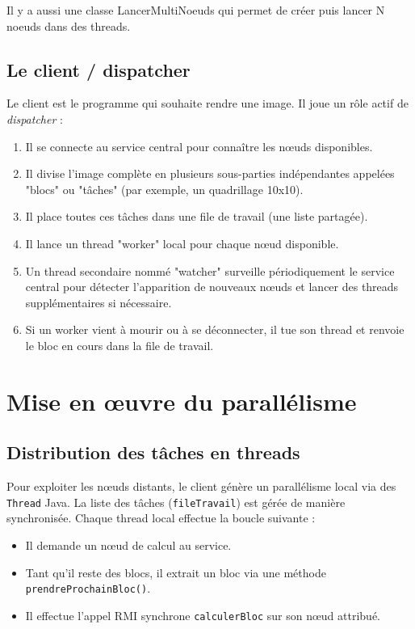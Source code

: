 \documentclass[a4paper,11pt]{article}
\begin{document}
Il y a aussi une classe LancerMultiNoeuds qui permet de créer puis lancer N noeuds dans des threads.

\subsection{Le client / dispatcher}

Le client est le programme qui souhaite rendre une image. Il joue un rôle actif de \textit{dispatcher} :
\begin{enumerate}
    \item Il se connecte au service central pour connaître les nœuds disponibles.
    \item Il divise l'image complète en plusieurs sous-parties indépendantes appelées "blocs" ou "tâches" (par exemple, un quadrillage 10x10).
    \item Il place toutes ces tâches dans une file de travail (une liste partagée).
    \item Il lance un thread "worker" local pour chaque nœud disponible.
    \item Un thread secondaire nommé "watcher" surveille périodiquement le service central pour détecter l'apparition de nouveaux nœuds et lancer des threads supplémentaires si nécessaire.
    \item Si un worker vient à mourir ou à se déconnecter, il tue son thread et renvoie le bloc en cours dans la file de travail.
\end{enumerate}

\newpage

\section{Mise en œuvre du parallélisme}

\subsection{Distribution des tâches en threads}

Pour exploiter les nœuds distants, le client génère un parallélisme local via des \texttt{Thread} Java. 
La liste des tâches (\texttt{fileTravail}) est gérée de manière synchronisée. Chaque thread local effectue la boucle suivante :
\begin{itemize}
    \item Il demande un nœud de calcul au service.
    \item Tant qu'il reste des blocs, il extrait un bloc via une méthode \texttt{prendreProchainBloc()}.
    \item Il effectue l'appel RMI synchrone \texttt{calculerBloc} sur son nœud attribué.
\end{itemize}
\end{document}

